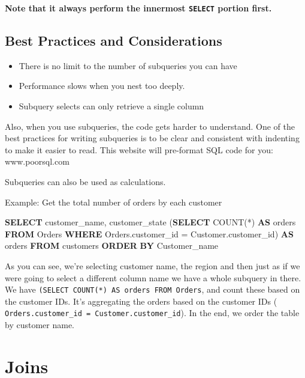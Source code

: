 \documentclass[]{book}
\newenvironment{Shaded}{\begin{snugshade}}{\end{snugshade}}
\newcommand{\KeywordTok}[1]{\textcolor[rgb]{0.13,0.29,0.53}{\textbf{{#1}}}}
\newcommand{\FunctionTok}[1]{\textcolor[rgb]{0.00,0.00,0.00}{{#1}}}
\newcommand{\NormalTok}[1]{{#1}}
\providecommand{\tightlist}{%
  \setlength{\itemsep}{0pt}\setlength{\parskip}{0pt}}
\theoremstyle{definition}
\theoremstyle{definition}
\theoremstyle{remark}
\begin{document}
\textbf{Note that it always perform the innermost \texttt{SELECT}
portion first. }

\subsection{Best Practices and
Considerations}\label{best-practices-and-considerations}

\begin{itemize}
\tightlist
\item
  There is no limit to the number of subqueries you can have
\item
  Performance slows when you nest too deeply.
\item
  Subquery selects can only retrieve a single column
\end{itemize}

Also, when you use subqueries, the code gets harder to understand. One
of the best practices for writing subqueries is to be clear and
consistent with indenting to make it easier to read. This website will
pre-format SQL code for you: www.poorsql.com

Subqueries can also be used as calculations.

Example: Get the total number of orders by each customer

\begin{Shaded}
\begin{Highlighting}[]
\KeywordTok{SELECT} \NormalTok{customer_name,}
    \NormalTok{customer_state (}\KeywordTok{SELECT} \FunctionTok{COUNT}\NormalTok{(*) }\KeywordTok{AS} \NormalTok{orders }\KeywordTok{FROM} \NormalTok{Orders }\KeywordTok{WHERE} 
        \NormalTok{Orders.customer_id = Customer.customer_id) }\KeywordTok{AS} \NormalTok{orders}
\KeywordTok{FROM} \NormalTok{customers}
\KeywordTok{ORDER} \KeywordTok{BY} \NormalTok{Customer_name}
\end{Highlighting}
\end{Shaded}

As you can see, we're selecting customer name, the region and then just
as if we were going to select a different column name we have a whole
subquery in there. We have
\texttt{(SELECT\ COUNT(*)\ AS\ orders\ FROM\ Orders}, and count these
based on the customer IDs. It's aggregating the orders based on the
customer IDs ( \texttt{Orders.customer\_id\ =\ Customer.customer\_id}).
In the end, we order the table by customer name.

\section{Joins}\label{joins}
\end{document}
